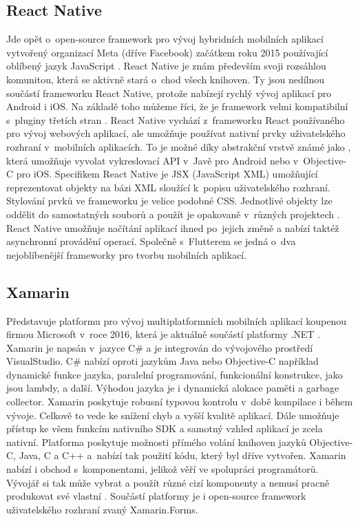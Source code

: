 \subsection{React Native}
Jde opět o~open-source framework pro vývoj hybridních mobilních aplikací vytvořený organizací Meta (dříve Facebook) začátkem roku 2015 používající oblíbený jazyk JavaScript \cite{reactnative}. React Native je znám především svoji rozsáhlou komunitou, která se aktivně stará o~chod všech knihoven. Ty jsou nedílnou součástí frameworku React Native, protože nabízejí rychlý vývoj aplikací pro Android i iOS. Na základě toho můžeme říci, že je framework velmi kompatibilní s~pluginy třetích stran \cite{flutter2}. React Native vychází z~frameworku React používaného pro vývoj webových aplikací, ale umožňuje používat nativní prvky uživatelského rozhraní v~mobilních aplikacích. To je možné díky abstrakční vrstvě známé jako , která umožňuje vyvolat vykreslovací API v~Javě pro Android nebo v~Objective-C pro iOS. Specifikem React Native je JSX (JavaScript XML) umožňující reprezentovat objekty na bázi XML sloužící k~popisu uživatelského rozhraní. Stylování prvků ve frameworku je velice podobné CSS. Jednotlivé objekty lze oddělit do samostatných souborů a použít je opakovaně v~různých projektech \cite{reactnative2}. React Native umožňuje načítání aplikací ihned po~jejich změně a nabízí taktéž asynchronní provádění operací. Společně s~Flutterem se jedná o~dva nejoblíbenější frameworky pro tvorbu mobilních aplikací. 

\subsection{Xamarin}
Představuje platformu pro vývoj multiplatformních mobilních aplikací koupenou firmou Microsoft v~roce 2016, která je aktuálně součástí platformy .NET \cite{xamarin}. Xamarin je napsán v~jazyce C\# a je integrován do vývojového prostředí VisualStudio. C\# nabízí oproti jazykům Java nebo Objective-C například dynamické funkce jazyka, paralelní programování, funkcionální konstrukce, jako jsou lambdy, a další. Výhodou jazyka je i dynamická alokace paměti a garbage collector. Xamarin poskytuje robusní typovou kontrolu v~době kompilace i během vývoje. Celkově to vede ke snížení chyb a vyšší kvalitě aplikací. Dále umožňuje přístup ke všem funkcím nativního SDK a samotný vzhled aplikací je zcela nativní. Platforma poskytuje možnosti přímého volání knihoven jazyků Objective-C, Java, C a C++ a~nabízí tak použití kódu, který byl dříve vytvořen. Xamarin nabízí i obchod s~komponentami, jelikož věří ve spolupráci programátorů. Vývojář si tak může vybrat a použít různé cizí komponenty a nemusí pracně produkovat své vlastní \cite{xamarin2}. Součástí platformy je i open-source framework uživatelského rozhraní zvaný Xamarin.Forms. 

